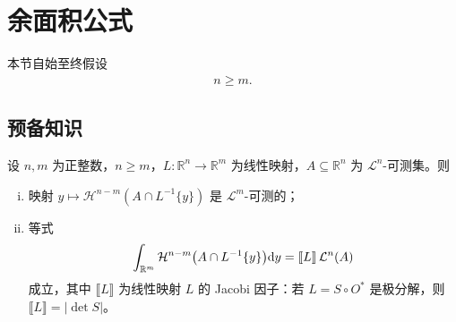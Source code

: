 \documentclass[../../main.tex]{subfiles}%
\begin{document}
\section{余面积公式}\label{section:ch03-04}

本节自始至终假设
\begin{align*}
n\geqslant m.
\end{align*}

\subsection{预备知识}\label{subsection:ch03-04-1}

\begin{lemma}\label{lemma:ch03-3-4}
设 $n,m$ 为正整数，$n\geqslant m$，$L:\mathbb{R}^n\to\mathbb{R}^m$ 为线性映射，$A\subseteq\mathbb{R}^n$ 为 $\mathcal{L}^n$-可测集。则
\begin{enumerate}[(i)]
\item 映射 $y\mapsto\mathcal{H}^{n-m}(A\cap L^{-1}\{y\})$ 是 $\mathcal{L}^m$-可测的；
\item 等式
\begin{align*}
\int_{\mathbb{R}^m}\mathcal{H}^{n-m}\bigl(A\cap L^{-1}\{y\}\bigr)\mathrm{d} y=\llbracket L\rrbracket\,\mathcal{L}^n(A)
\end{align*}
成立，其中 $\llbracket L\rrbracket$ 为线性映射 $L$ 的 Jacobi 因子：若 $L=S\circ O^*$ 是极分解，则 $\llbracket L\rrbracket=|\det S|$。
\end{enumerate}
\end{lemma}
\end{document}
